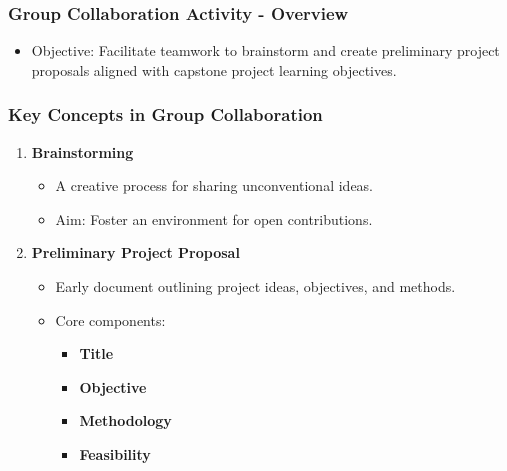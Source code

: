 \documentclass[aspectratio=169]{beamer}
\begin{document}
\begin{frame}[fragile]
    \frametitle{Group Collaboration Activity - Overview}
    \begin{itemize}
        \item Objective: Facilitate teamwork to brainstorm and create preliminary project proposals aligned with capstone project learning objectives.
    \end{itemize}
\end{frame}

\begin{frame}[fragile]
    \frametitle{Key Concepts in Group Collaboration}
    \begin{enumerate}
        \item \textbf{Brainstorming}
        \begin{itemize}
            \item A creative process for sharing unconventional ideas.
            \item Aim: Foster an environment for open contributions.
        \end{itemize}

        \item \textbf{Preliminary Project Proposal}
        \begin{itemize}
            \item Early document outlining project ideas, objectives, and methods.
            \item Core components:
            \begin{itemize}
                \item \textbf{Title}
                \item \textbf{Objective}
                \item \textbf{Methodology}
                \item \textbf{Feasibility}
            \end{itemize}
        \end{itemize}
    \end{enumerate}
\end{frame}
\end{document}
